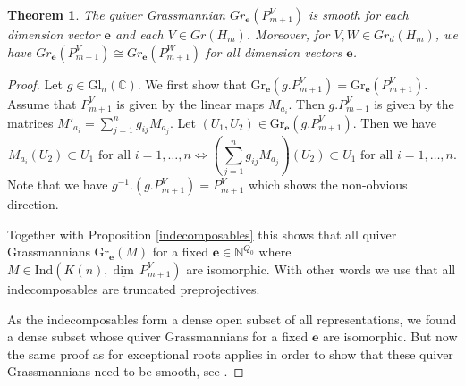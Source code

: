 \documentclass{amsart}
\newtheorem{theorem}{Theorem}[section]
\newcommand{\bfe}{\mathbf{e}}
\newcommand\udim{{\underline{\dim}\, }}
\newcommand{\Gr}{\mathrm{Gr}}
\newcommand{\Gl}{\mathrm{Gl}}
\newcommand{\Ind}{\mathrm{Ind}}
\newcommand{\CC}{\mathbb{C}}
\newcommand{\NN}{\mathbb{N}}
\begin{document}
\begin{theorem}
  The quiver Grassmannian $Gr_\bfe(P_{m+1}^V)$ is smooth for each dimension vector $\bfe$ and each $V\in Gr(H_m)$.
  Moreover, for $V,W\in Gr_d(H_m)$, we have $Gr_\bfe(P_{m+1}^V)\cong Gr_\bfe(P_{m+1}^W)$ for all dimension vectors $\bfe$.
\end{theorem}
\begin{proof}
Let $g\in\Gl_n(\CC)$. We first show that $\Gr_\bfe(g.P_{m+1}^V)=\Gr_\bfe(P_{m+1}^V)$. Assume that $P_{m+1}^V$ is given by the linear maps $M_{a_i}$. Then $g.P_{m+1}^V$ is given by the matrices $M'_{a_i}=\sum\limits_{j=1}^n g_{ij}M_{a_j}$. Let $(U_1,U_2)\in\Gr_\bfe(g.P_{m+1}^V)$. Then we have  
\[M_{a_i}(U_2)\subset U_1 \text{ for all } i=1,\ldots,n\Leftrightarrow \left(\sum\limits_{j=1}^n g_{ij}M_{a_j}\right)(U_2)\subset U_1 \text{ for all } i=1,\ldots,n.\]
Note that we have $g^{-1}.(g.P_{m+1}^V)=P_{m+1}^V$ which shows the non-obvious direction.

Together with Proposition \ref{indecomposables} this shows that all quiver Grassmannians $\Gr_\bfe(M)$ for a fixed $\bfe\in\NN^{Q_0}$ where $M\in\Ind(K(n),\udim P_{m+1}^V)$ are isomorphic. With other words we use that all indecomposables are truncated preprojectives.

As the indecomposables form a dense open subset of all representations, we found a dense subset whose quiver Grassmannians for a fixed $\bfe$ are isomorphic. But now the same proof as for exceptional roots applies in order to show that these quiver Grassmannians need to be smooth, see \cite[Corollary 4]{cr}.

\end{proof}
\end{document}

